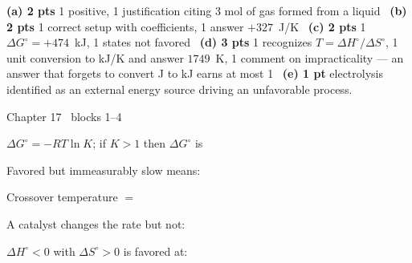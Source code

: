 \documentclass{apchem-worksheet}
\begin{document}
\begin{apcnote}
\textbf{(a) 2 pts} 1 positive, 1 justification citing 3 mol of gas formed
from a liquid \textbullet\ \textbf{(b) 2 pts} 1 correct setup with
coefficients, 1 answer $+327$~J/K \textbullet\ \textbf{(c) 2 pts} 1
$\Delta G^\circ = +474$~kJ, 1 states not favored \textbullet\
\textbf{(d) 3 pts} 1 recognizes $T = \Delta H^\circ/\Delta S^\circ$,
1 unit conversion to kJ/K and answer $1749$~K, 1 comment on impracticality
--- an answer that forgets to convert J to kJ earns at most 1 \textbullet\
\textbf{(e) 1 pt} electrolysis identified as an external energy source
driving an unfavorable process.
\end{apcnote}

\begin{spiralstrip}{Chapter 17 \textbullet\ blocks 1--4}
  \item $\Delta G^\circ = -RT\ln K$; if $K > 1$ then $\Delta G^\circ$ is
        \answerblank[2cm]{negative}
  \item Favored but immeasurably slow means:
  \item Crossover temperature $=$ 
  \item A catalyst changes the rate but not:
        \answerblank[2cm]{$K$}
  \item $\Delta H^\circ < 0$ with $\Delta S^\circ > 0$ is favored at:
\end{spiralstrip}
\end{document}
